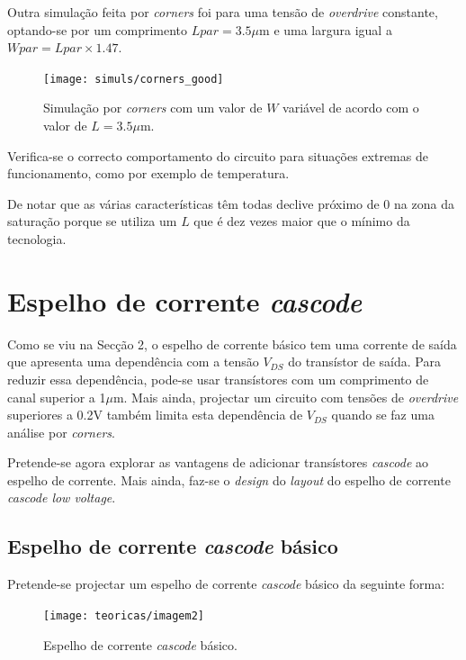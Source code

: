 \documentclass[11pt]{article}
\numberwithin{equation}{section}
\begin{document}
Outra simulação feita por \textit{corners} foi para uma tensão de \textit{overdrive} constante, optando-se por um comprimento $Lpar = 3.5\mu$m e uma largura igual a $Wpar = Lpar\times1.47$.

\begin{figure}[h]
	\centering
	\texttt{[image: simuls/corners\_good]}
	\vspace{-0.8em}
	\caption{Simulação por \textit{corners} com um valor de $W$ variável de acordo com o valor de $L = 3.5\mu$m.}
	\vspace{-0.8em}
\end{figure} 

Verifica-se o correcto comportamento do circuito para situações extremas de funcionamento, como por exemplo de temperatura.

De notar que as várias características têm todas declive próximo de 0 na zona da saturação porque se utiliza um $L$ que é dez vezes maior que o mínimo da tecnologia.

\pagebreak

\section{Espelho de corrente \textit{cascode}}

Como se viu na Secção 2, o espelho de corrente básico tem uma corrente de saída que apresenta uma dependência com a tensão $V_{DS}$ do transístor de saída. Para reduzir essa dependência, pode-se usar transístores com um comprimento de canal superior a 1$\mu$m. Mais ainda, projectar um circuito com tensões de \textit{overdrive} superiores a 0.2V também limita esta dependência de $V_{DS}$ quando se faz uma análise por \textit{corners}.

Pretende-se agora explorar as vantagens de adicionar transístores \textit{cascode} ao espelho de corrente. Mais ainda, faz-se o \textit{design} do \textit{layout} do espelho de corrente \textit{cascode low voltage}.

\subsection{Espelho de corrente \textit{cascode} básico}

Pretende-se projectar um espelho de corrente \textit{cascode} básico da seguinte forma:

\begin{figure}[h]
	\centering
	\texttt{[image: teoricas/imagem2]}
	\vspace{-0.8em}
	\caption{Espelho de corrente \textit{cascode} básico.}
	\vspace{-0.8em}
\end{figure} 
\end{document}
